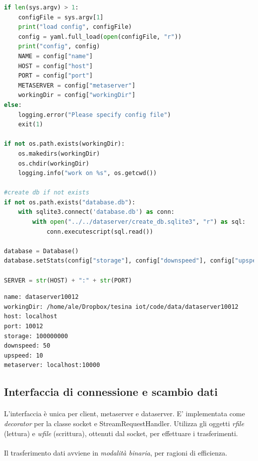 \documentclass[11pt,a4paper,english]{article}
\begin{document}
\begin{lstlisting}[language=Python, title=Codice]
if len(sys.argv) > 1:
	configFile = sys.argv[1]
	print("load config", configFile)
	config = yaml.full_load(open(configFile, "r"))
	print("config", config)
	NAME = config["name"]
	HOST = config["host"]
	PORT = config["port"]
	METASERVER = config["metaserver"]
	workingDir = config["workingDir"]
else:
	logging.error("Please specify config file")
	exit(1)
	
if not os.path.exists(workingDir):
	os.makedirs(workingDir)
	os.chdir(workingDir)
	logging.info("work on %s", os.getcwd())

#create db if not exists
if not os.path.exists("database.db"):
	with sqlite3.connect('database.db') as conn:
		with open("../../dataserver/create_db.sqlite3", "r") as sql:
			conn.executescript(sql.read())

database = Database()
database.setStats(config["storage"], config["downspeed"], config["upspeed"])

SERVER = str(HOST) + ":" + str(PORT)

\end{lstlisting}

\begin{lstlisting}[title=Esempio di configurazione]
name: dataserver10012
workingDir: /home/ale/Dropbox/tesina iot/code/data/dataserver10012
host: localhost
port: 10012
storage: 100000000
downspeed: 50
upspeed: 10
metaserver: localhost:10000
\end{lstlisting}


\subsection{Interfaccia di connessione e scambio dati}

\paragraph{} L'interfaccia è unica per client, metaserver e dataserver. E' implementata come \emph{decorator} per la classe socket e StreamRequestHandler. Utilizza gli oggetti \emph{rfile} (lettura) e \emph{wfile} (scrittura), ottenuti dal socket, per effettuare i trasferimenti. 

\paragraph{} Il trasferimento dati avviene in \emph{modalità binaria}, per ragioni di efficienza. 
\end{document}
